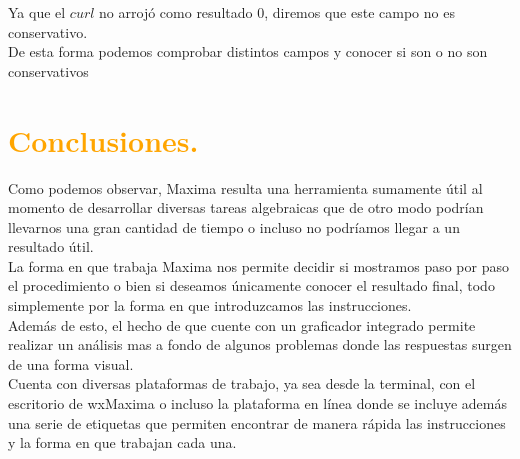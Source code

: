 \documentclass[12pt]{article}
\begin{document}
Ya que el $curl$ no arrojó como resultado $0$, diremos que este campo no es conservativo.\\
De esta forma podemos comprobar distintos campos y conocer si son o no son conservativos

\pagebreak
\section*{\textcolor{Orange}{Conclusiones.}}

Como podemos observar, Maxima resulta una herramienta sumamente útil al momento de desarrollar diversas tareas algebraicas que de otro modo podrían llevarnos una gran cantidad de tiempo o incluso no podríamos llegar a un resultado útil.\\

La forma en que trabaja Maxima nos permite decidir si mostramos paso por paso el procedimiento o bien si deseamos únicamente conocer el resultado final, todo simplemente por la forma en que introduzcamos las instrucciones.\\

Además de esto, el hecho de que cuente con un graficador integrado permite realizar un análisis mas a fondo de algunos problemas donde las respuestas surgen de una forma visual.\\

Cuenta con diversas plataformas de trabajo, ya sea desde la terminal, con el escritorio de wxMaxima o incluso la plataforma en línea donde se incluye además una serie de etiquetas que permiten encontrar de manera rápida las instrucciones y la forma en que trabajan cada una.


 
\pagebreak
\end{document}
